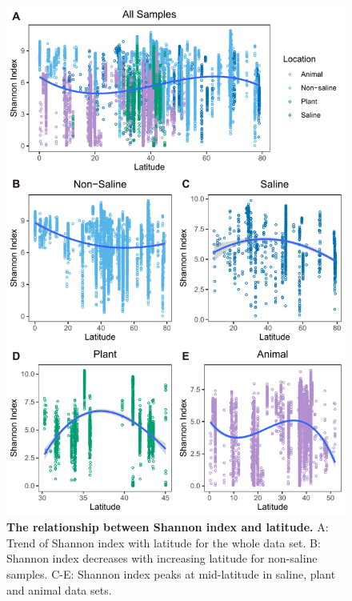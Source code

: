 \begin{figure}[H]
    \centering
    \includegraphics[scale=0.9]{./Figures/Shan_lati_empo2}
    \caption{\textbf{The relationship between Shannon index and latitude.} A: Trend of Shannon index with latitude for the whole data set. B: Shannon index decreases with increasing latitude for non-saline samples. C-E: Shannon index peaks at mid-latitude in saline, plant and animal data sets.}
    \label{fig:Shan_lati}
\end{figure}

